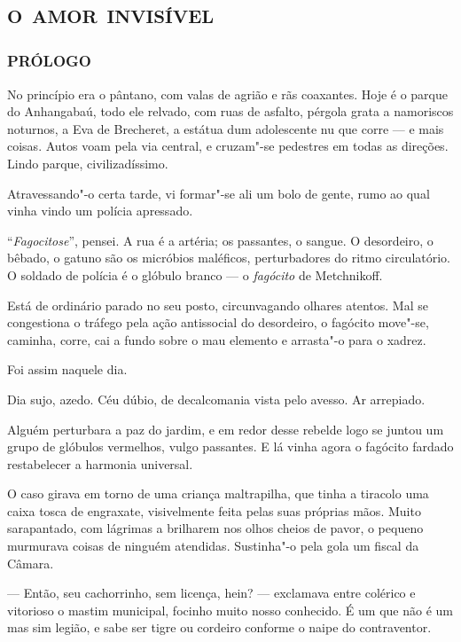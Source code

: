 \part{\textsc{o amor invisível}}


\section*{PRÓLOGO}

\noindent{}No princípio era o pântano, com valas de agrião e rãs coaxantes. Hoje é
o parque do Anhangabaú, todo ele relvado, com ruas de asfalto, pérgola
grata a namoriscos noturnos, a Eva de Brecheret, a estátua dum
adolescente nu que corre --- e mais coisas. Autos voam pela via central,
e cruzam"-se pedestres em todas as direções. Lindo parque,
civilizadíssimo.

Atravessando"-o certa tarde, vi formar"-se ali um bolo de gente, rumo ao
qual vinha vindo um polícia apressado.

``\emph{Fagocitose}'', pensei. A rua é a artéria; os passantes, o
sangue. O desordeiro, o bêbado, o gatuno são os micróbios maléficos,
perturbadores do ritmo circulatório. O soldado de polícia é o glóbulo
branco --- o \emph{fagócito} de Metchnikoff.

Está de ordinário parado no seu posto, circunvagando olhares atentos.
Mal se congestiona o tráfego pela ação antissocial do desordeiro, o
fagócito move"-se, caminha, corre, cai a fundo sobre o mau elemento e
arrasta"-o para o xadrez.

Foi assim naquele dia.

Dia sujo, azedo. Céu dúbio, de decalcomania vista pelo avesso. Ar
arrepiado.

Alguém perturbara a paz do jardim, e em redor desse rebelde logo se
juntou um grupo de glóbulos vermelhos, vulgo passantes. E lá vinha agora
o fagócito fardado restabelecer a harmonia universal.

O caso girava em torno de uma criança maltrapilha, que tinha a tiracolo
uma caixa tosca de engraxate, visivelmente feita pelas suas próprias
mãos. Muito sarapantado, com lágrimas a brilharem nos olhos cheios de
pavor, o pequeno murmurava coisas de ninguém atendidas. Sustinha"-o pela
gola um fiscal da Câmara.

--- Então, seu cachorrinho, sem licença, hein? --- exclamava entre
colérico e vitorioso o mastim municipal, focinho muito nosso conhecido.
É um que não é um mas sim legião, e sabe ser tigre ou cordeiro conforme
o naipe do contraventor.

